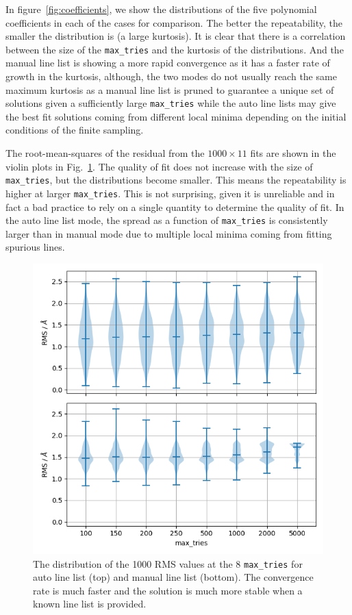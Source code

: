 \documentclass[fleqn,usenatbib]{rasti}
\begin{document}
In figure~\ref{fig:coefficients}, we show the distributions of the five polynomial
coefficients in each of the cases for comparison. The better the repeatability, the
smaller the distribution is (a large kurtosis). It is clear that there is a correlation
between the size of the \texttt{max\_tries} and the kurtosis of the distributions. And
the manual line list is showing a more rapid convergence as it has a faster rate of
growth in the kurtosis, although, the two modes do not usually reach the same maximum
kurtosis as a manual line list is pruned to guarantee a unique set of solutions given a
sufficiently large \texttt{max\_tries} while the auto line lists may give the best fit
solutions coming from different local minima depending on the initial conditions of
the finite sampling.

The root-mean-squares of the residual from the $1000 \times 11$ fits are shown in the
violin plots in Fig.~\ref{fig:rms}. The quality of fit does not increase with the size
of \texttt{max\_tries}, but the distributions become smaller. This means the
repeatability is higher at larger \texttt{max\_tries}. This is not surprising, given
it is unreliable and in fact a bad practice to rely on a single quantity to determine
the quality of fit. In the auto line list mode, the spread as a function of
\texttt{max\_tries} is consistently larger than in manual mode due to multiple local
minima coming from fitting spurious lines.

\begin{figure}[h]
    \centering
    \includegraphics[width=\columnwidth]{plots/figure_2_rms.png}
    \caption{The distribution of the 1000 RMS values at the 8 \texttt{max\_tries} for
    auto line list (top) and manual line list (bottom). The convergence rate is much
    faster and the solution is much more stable when a known line list is provided.}
    \label{fig:rms}
\end{figure}
\end{document}
